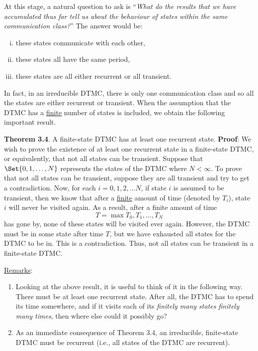At this stage, a natural question to ask is ``\emph{What do the results that we have accumulated thus
    far tell us about the behaviour of states within the same communication class?}'' The answer
would be:
\begin{enumerate}[(i)]
    \item these states communicate with each other,
    \item these states all have the same period,
    \item these states are all either recurrent or all transient.
\end{enumerate}
In fact, in an irreducible DTMC, there is only one communication class and so all the states
are either recurrent or transient. When the assumption that the DTMC has a \underline{finite} number of
states is included, we obtain the following important result.
\begin{Result}
    \textbf{Theorem 3.4}. A finite-state DTMC has at least one recurrent state.
    \tcblower{}
    \textbf{Proof}: We wish to prove the existence of at least
    one recurrent state in a finite-state DTMC, or equivalently,
    that not all states can be transient. Suppose that $ \Set{0,1,\ldots,N} $
    represents the states of the DTMC where $ N<\infty $. To prove
    that not all states can be transient, suppose they
    are all transient and try to get a contradiction. Now, for each $ i=0,1,2,\ldots N $,
    if state $ i $ is assumed to be transient, then we know that after
    a \underline{finite} amount of time (denoted by $ T_i $),
    state $ i $ will never be visited again. As a result, after a finite amount
    of time
    \[ T=\max{T_0,T_1,\ldots,T_N} \]
    has gone by, none of these states will be visited ever again. However,
    the DTMC must be in some state after time $ T $, but we have exhausted
    all states for the DTMC to be in. This is a contradiction. Thus,
    not all states can be transient in a finite-state DTMC\@.
\end{Result}
\underline{Remarks}:
\begin{enumerate}[(1)]
    \item Looking at the above result, it is useful to think of it in the following way. There must be
          at least one recurrent state. After all, the DTMC has to spend its time somewhere, and if
          it visits each of its \emph{finitely many states finitely many times}, then where else could it
          possibly go?
    \item As an immediate consequence of Theorem 3.4, an irreducible, finite-state DTMC must be
          recurrent (i.e., all states of the DTMC are recurrent).
\end{enumerate}
